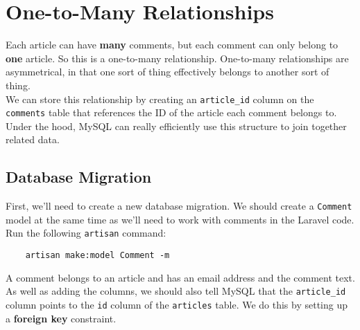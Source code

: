 \section{One-to-Many Relationships}

Each article can have \textbf{many} comments, but each comment can only belong to \textbf{one} article. So this is a one-to-many relationship. One-to-many relationships are asymmetrical, in that one sort of thing effectively belongs to another sort of thing.
\\

We can store this relationship by creating an \texttt{article\_id} column on the \texttt{comments} table that references the ID of the article each comment belongs to. Under the hood, MySQL can really efficiently use this structure to join together related data.



\subsection{Database Migration}

First, we'll need to create a new database migration. We should create a \texttt{Comment} model at the same time as we'll need to work with comments in the Laravel code. Run the following \texttt{artisan} command:

\begin{verbatim}
    artisan make:model Comment -m
\end{verbatim}

A comment belongs to an article and has an email address and the comment text. As well as adding the columns, we should also tell MySQL that the \texttt{article\_id} column points to the \texttt{id} column of the \texttt{articles} table. We do this by setting up a \textbf{foreign key} constraint.

